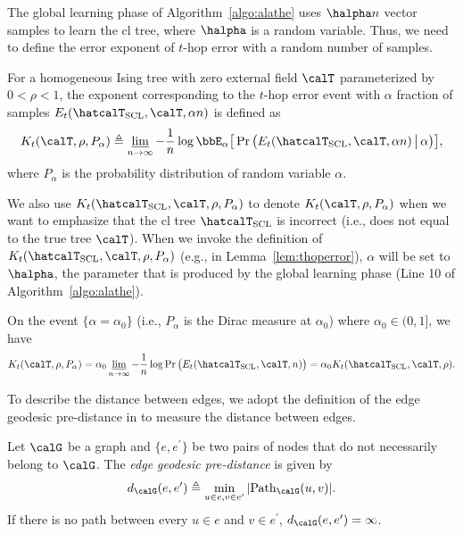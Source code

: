 \documentclass[11pt,onecolumn]{article}
\begin{document}
The global learning phase of Algorithm~\ref{algo:alathe} uses $\halpha n$ vector samples to learn the \ac{cl} tree, where $\halpha$ is a random variable. Thus, we need to define the error exponent of 
$t$-hop error with a random number of samples.
\begin{definition}
For a homogeneous Ising tree with zero external field $\calT$ parameterized by $0<\rho<1$, the exponent corresponding to the $t$-hop error event with $\alpha$ fraction of samples $E_{t}(\hatcalT_{{\rm SCL}},\calT,\alpha n)$ is defined as
\begin{align}
	K_{t}(\calT,\rho,P_{\alpha})\triangleq\varliminf_{n\rightarrow\infty} -\frac{1}{n}\log\bbE_{\alpha}\big[\Pr\big(E_{t}(\hatcalT_{{\rm SCL}},\calT,\alpha n)\,\big|\,\alpha \big)\big],
\end{align}
where $P_{\alpha}$ is the probability distribution of random variable $\alpha$.
\end{definition}
We also use $K _{t}(\hatcalT_{{\rm SCL}},\calT,\rho,P_{\alpha})$ to denote $K _{t}(\calT,\rho,P_{\alpha})$ when we want to emphasize that the \ac{cl} tree $\hatcalT_{{\rm SCL}}$ is incorrect (i.e., does not equal to the true tree $\calT$). When we invoke the definition of $K_t(\hatcalT_{{\rm SCL}},\calT,\rho,P_{\alpha})$ (e.g., in Lemma~\ref{lem:thoperror}), $\alpha$ will be set to $\halpha$, the parameter that is produced by the global learning phase (Line 10 of Algorithm~\ref{algo:alathe}).
\begin{remark}
	On the event $\{\alpha=\alpha_{0}\}$ (i.e., $P_\alpha$ is the Dirac measure at $\alpha_0$) where $\alpha_{0}\in(0,1]$, we have
	\begin{align}
		K _{t}(\calT,\rho,P_{\alpha})=\alpha_{0} \varliminf_{n\rightarrow\infty} -\frac{1}{n}\log\Pr\big(E_{t}(\hatcalT_{{\rm SCL}},\calT,n)\big)=\alpha_{0} K _{t}(\hatcalT_{{\rm SCL}},\calT,\rho).
	\end{align}
\end{remark}
To describe the distance between edges, we adopt the definition of the edge geodesic pre-distance in \cite{neykov2019property} 
to measure the distance between edges.
\begin{definition}
	Let $\calG$ be a graph and $\{e,e^{\prime}\}$ be two pairs of nodes that do not necessarily  belong to $\calG$. The {\em edge geodesic pre-distance} is given by
	\begin{align}
		d_{\calG}(e,e^{\prime})\triangleq \min_{u\in e,v\in e^{\prime}} |{\rm Path}_{\calG}(u,v)|.
	\end{align}
	If there is no path between  every $u\in e$ and $v\in e^{\prime}$, $d_{\calG}(e,e^{\prime})=\infty$.
\end{definition}
\end{document}

